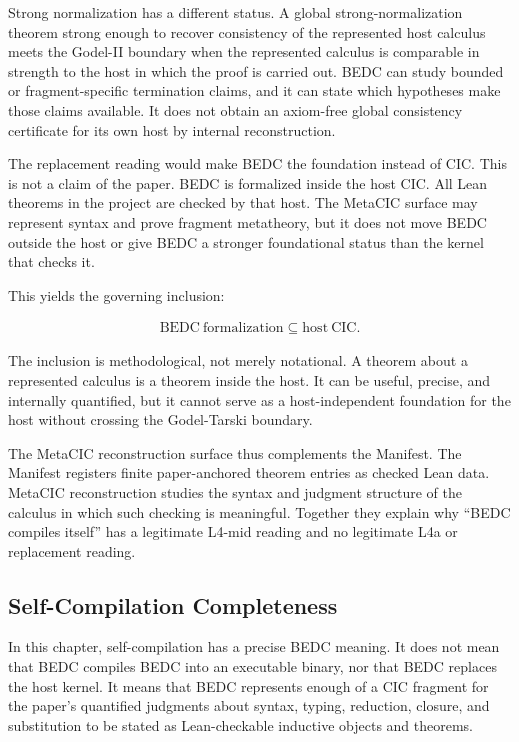 Strong normalization has a different status. A global strong-normalization
theorem strong enough to recover consistency of the represented host calculus
meets the Godel-II boundary when the represented calculus is comparable in
strength to the host in which the proof is carried out. BEDC can study bounded
or fragment-specific termination claims, and it can state which hypotheses make
those claims available. It does not obtain an axiom-free global consistency
certificate for its own host by internal reconstruction.

The replacement reading would make BEDC the foundation instead of CIC. This is
not a claim of the paper. BEDC is formalized inside the host CIC. All Lean
theorems in the project are checked by that host. The MetaCIC surface may
represent syntax and prove fragment metatheory, but it does not move BEDC
outside the host or give BEDC a stronger foundational status than the kernel
that checks it.

This yields the governing inclusion:

$$
\begin{aligned}
\mathrm{BEDC\ formalization} \subseteq \mathrm{host\ CIC}.
\end{aligned}
$$

The inclusion is methodological, not merely notational. A theorem about a
represented calculus is a theorem inside the host. It can be useful, precise,
and internally quantified, but it cannot serve as a host-independent foundation
for the host without crossing the Godel-Tarski boundary.

The MetaCIC reconstruction surface thus complements the Manifest. The Manifest
registers finite paper-anchored theorem entries as checked Lean data. MetaCIC
reconstruction studies the syntax and judgment structure of the calculus in
which such checking is meaningful. Together they explain why ``BEDC compiles
itself'' has a legitimate L4-mid reading and no legitimate L4a or replacement
reading.

\subsection{Self-Compilation Completeness}\label{subsec:reconstruction-self-comp-completeness}

In this chapter, self-compilation has a precise BEDC meaning. It does not mean
that BEDC compiles BEDC into an executable binary, nor that BEDC replaces the
host kernel. It means that BEDC represents enough of a CIC fragment for the
paper's quantified judgments about syntax, typing, reduction, closure, and
substitution to be stated as Lean-checkable inductive objects and theorems.

